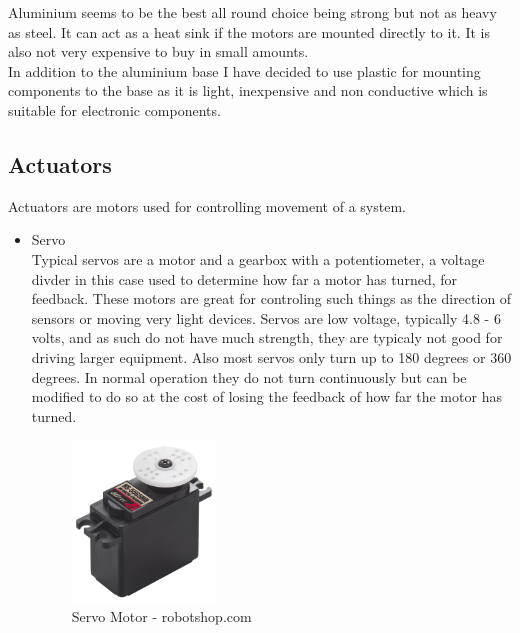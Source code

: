 Aluminium seems to be the best all round choice being strong but not as heavy as steel.  It can act as a heat sink if the motors are mounted directly to it.  It is also not very expensive to buy in small amounts.
\\In addition to the aluminium base I have decided to use plastic for mounting components to the base as it is light, inexpensive and non conductive which is suitable for electronic components.

\subsection{Actuators}
Actuators are motors used for controlling movement of a system.
\begin{itemize}
\item Servo
\\Typical servos are a motor and a gearbox with a potentiometer, a voltage divder in this case used to determine how far a motor has turned, for feedback.  These motors are great for controling such things as the direction of sensors or moving very light devices.  Servos are low voltage, typically 4.8 - 6 volts, and as such do not have much strength, they are typicaly not good for driving larger equipment.  Also most servos only turn up to 180 degrees or 360 degrees.  In normal operation they do not turn continuously but can be modified to do so at the cost of losing the feedback of how far the motor has turned.
\begin{figure}[h]
\centering
        \includegraphics[width=1.5in] {Images/servo.jpg}
        \caption{Servo Motor - robotshop.com}
        \label{Servo Motor}
\end{figure}


\end{itemize}
